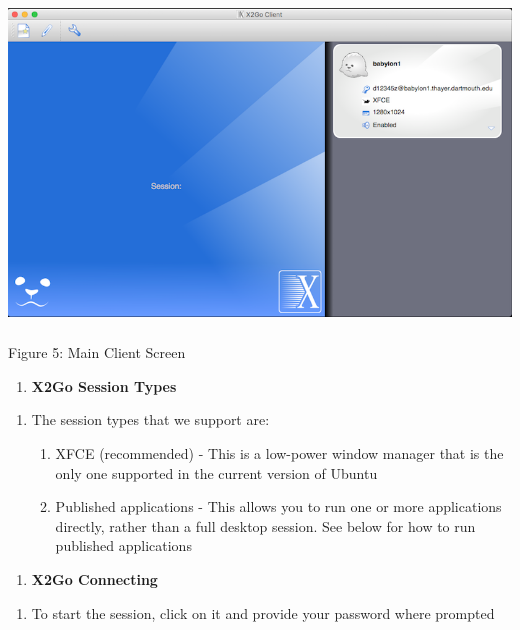 \documentclass{article}
\begin{document}
\includegraphics[width=5.50787in,height=3.38189in]{images/media/image5.png}

Figure 5: Main Client Screen

\begin{enumerate}
\def\labelenumi{\Alph{enumi}.}
\setcounter{enumi}{2}
\item
  \textbf{X2Go Session Types}
\end{enumerate}

\begin{enumerate}
\def\labelenumi{\arabic{enumi}.}
\setcounter{enumi}{8}
\item
  The session types that we support are:

  \begin{enumerate}
  \def\labelenumii{\arabic{enumii}.}
  \item
    XFCE (recommended) - This is a low-power window manager that is the
    only one supported in the current version of Ubuntu
  \item
    Published applications - This allows you to run one or more
    applications directly, rather than a full desktop session. See below
    for how to run published applications
  \end{enumerate}
\end{enumerate}

\begin{enumerate}
\def\labelenumi{\Alph{enumi}.}
\setcounter{enumi}{3}
\item
  \textbf{X2Go Connecting}
\end{enumerate}

\begin{enumerate}
\def\labelenumi{\arabic{enumi}.}
\setcounter{enumi}{9}
\item
  To start the session, click on it and provide your password where
  prompted
\end{enumerate}
\end{document}
